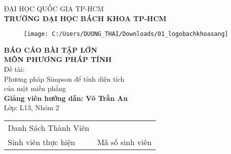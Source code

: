 \documentclass[14pt,a4paper]{article}
\begin{document}
\thispagestyle{empty}
\begin{titlepage}
\begin{center}
	\fontsize{16pt}{0pt}\selectfont ĐẠI HỌC QUỐC GIA TP-HCM\\
	\vspace{6pt}\textbf{\fontsize{16pt}{0pt}\selectfont TRƯỜNG ĐẠI HỌC BÁCH KHOA TP-HCM\\}
	\vspace{0.3cm}
	\begin{figure}[H]
		\centering
\texttt{[image: C:/Users/DUONG\_THAI/Downloads/01\_logobachkhoasang]}
	\end{figure}
	\vspace{0.2cm}
	\textbf{\fontsize{20pt}{0pt}\selectfont BÁO CÁO BÀI TẬP LỚN\\}
	\vspace{0.2cm}
	\textbf{\fontsize{18pt}{0pt}\selectfont MÔN PHƯƠNG PHÁP TÍNH\\}
	\vspace{0.2cm}
\fontsize{20pt}{0pt}\selectfont Đề tài:\\

	\fontsize{22pt}{0pt}\selectfont Phương pháp Simpson để tính diện tích \\
	\fontsize{22pt}{0pt}\selectfont của một miền phẳng\\
	\vspace{0.5cm}
	\textbf{\fontsize{20pt}{0pt}\selectfont Giảng viên hướng dẫn: Võ Trần An\\}
	\vspace{0.2cm}
	\fontsize{20pt}{0pt}\selectfont Lớp: L13, Nhóm 2\\
	\vspace{0.5cm}
	\begin{tabular}{l l}
		\fontsize{16pt}{0pt}\selectfont Danh Sách Thành Viên \vspace{6pt}\\
		\fontsize{16pt}{0pt}\selectfont Sinh viên thực hiện & \fontsize{16pt}{0pt}\selectfont Mã số sinh viên\\
	
	\end{tabular}


\end{center}
\end{titlepage}
\cleardoublepage 
\thispagestyle{empty}
\end{document}
